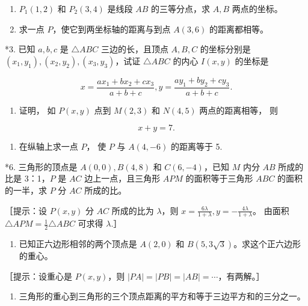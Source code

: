 \begin{enumerate}
\def\labelenumi{\arabic{enumi}.}
\item
  \(P_{1}(1,2)\) 和 \(P_{2}(3,4)\) 是线段 \(AB\) 的三等分点，求 \(A,B\)
  两点的坐标。
\item
  求一点 \(P\)，使它到两坐标轴的距离与到点 \(A(3,6)\) 的距离都相等。
\end{enumerate}

*3. 已知 \(a, b, c\) 是 \(\triangle ABC\) 三边的长，且顶点 \(A, B, C\)
的坐标分别是 \((x_1, y_1), (x_2, y_2), (x_3, y_3)\)，试证
\(\triangle ABC\) 的内心 \(I(x, y)\) 的坐标是

\[
x = \frac {a x_{1} + b x_{2} + c x_{3}}{a + b + c}, y = \frac {a y_{1} + b y_{2} + c y_{3}}{a + b + c}.
\]

\begin{enumerate}
\def\labelenumi{\arabic{enumi}.}
\setcounter{enumi}{3}
\tightlist
\item
  证明， 如 \(P(x, y)\) 点到 \(M(2, 3)\) 和 \(N(4, 5)\) 两点的距离相等，
  则
\end{enumerate}

\[
x + y = 7.
\]

\begin{enumerate}
\def\labelenumi{\arabic{enumi}.}
\setcounter{enumi}{4}
\tightlist
\item
  在纵轴上求一点 \(P\)， 使 \(P\) 与 \(A(4, -6)\) 的距离等于 5.
\end{enumerate}

*6. 三角形的顶点是 \(A(0,0), B(4,8)\) 和 \(C(6,-4)\)，已知 \(M\) 内分
\(AB\) 所成的比是 3：1，\(P\) 是 \(AC\) 边上一点，且三角形 \(APM\)
的面积等于三角形 \(ABC\) 的面积的一半，求 \(P\) 分 \(AC\) 所成的比。

［提示：设 \(P(x, y)\) 分 \(AC\) 所成的比为 \(\lambda\)，则
\(x = \frac{6\lambda}{1 + \lambda}, y = -\frac{4\lambda}{1 + \lambda}\)。
由面积 \(\triangle APM = \frac{1}{2} \triangle ABC\) 可求得
\(\lambda\).］

\begin{enumerate}
\def\labelenumi{\arabic{enumi}.}
\setcounter{enumi}{6}
\tightlist
\item
  已知正六边形相邻的两个顶点是 \(A(2,0)\) 和
  \(B(5,3\sqrt{3})\)。求这个正六边形的重心。
\end{enumerate}

［提示：设重心是 \(P(x, y)\)，则
\(|PA| = |PB| = |AB| = \cdots\)，有两解。］

\begin{enumerate}
\def\labelenumi{\arabic{enumi}.}
\setcounter{enumi}{7}
\tightlist
\item
  三角形的重心到三角形的三个顶点距离的平方和等于三边平方和的三分之一。
\end{enumerate}

